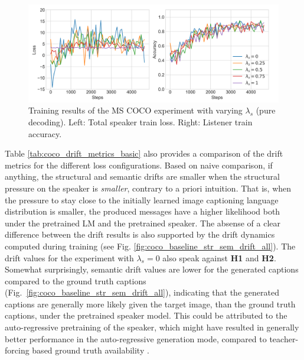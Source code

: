 \begin{figure}[h]
	\centering
	\includegraphics[width=\linewidth]{images/coco_refgame_4000_pure_all_Ls_random.png}
	\caption{Training results of the MS COCO experiment with varying $\lambda_s$ (pure decoding). Left: Total speaker train loss. Right: Listener train accuracy.}
	\label{fig:coco_baseline_speaker_loss_listener_acc_all}
\end{figure}

Table \ref{tab:coco_drift_metrics_basic} also provides a comparison of the drift metrics for the different loss configurations. Based on naive comparison, if anything, the structural and semantic drifts are smaller when the structural pressure on the speaker is \emph{smaller}, contrary to a priori intuition. That is, when the pressure to stay close to the initially learned image captioning language distribution is smaller, the produced messages have a higher likelihood both under the pretrained LM and the pretrained speaker. The absense of a clear difference between the drift results is also supported by the drift dynamics computed during training (see Fig. \ref{fig:coco_baseline_str_sem_drift_all}). 
The drift values for the experiment with $\lambda_s = 0$ also speak against \textbf{H1} and \textbf{H2}. Somewhat surprisingly, semantic drift values are lower for the generated captions compared to the ground truth captions (Fig.~\ref{fig:coco_baseline_str_sem_drift_all}), indicating that the generated captions are generally more likely given the target image, than the ground truth captions, under the pretrained speaker model. This could be attributed to the auto-regressive pretraining of the speaker, which might have resulted in generally better performance in the auto-regressive generation mode, compared to teacher-forcing based ground truth availability .

